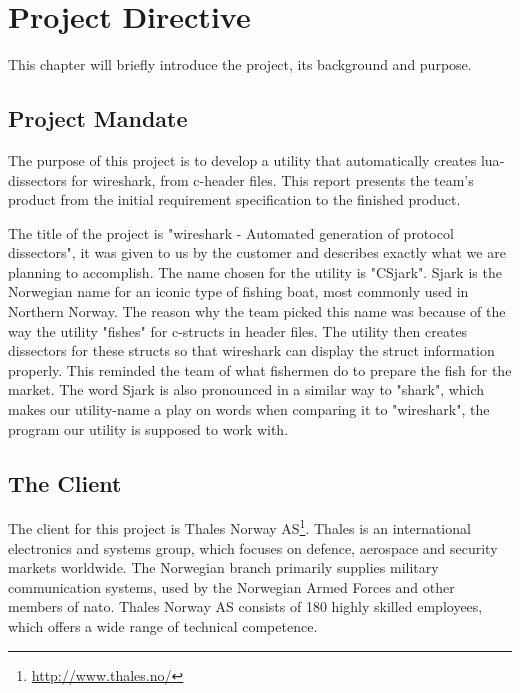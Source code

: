 \chapter{Project Directive}
This chapter will briefly introduce the project, its background and purpose.


\section{Project Mandate}
The purpose of this project is to develop a \gls{utility} that automatically creates \Gls{lua}-\glspl{dissector} for \Gls{wireshark}, from \Gls{c}-\gls{header} files. This report presents the team’s product from the initial requirement specification to the finished product. 

The title of the project is "\Gls{wireshark} - Automated generation of \gls{protocol} \glspl{dissector}", it was given to us by the customer and describes exactly what we are planning to accomplish.\cite{Compendium} The name chosen for the \gls{utility} is "CSjark". Sjark is the Norwegian name for an iconic type of fishing boat, most commonly used in Northern Norway. The reason why the team picked this name was because of the way the \gls{utility} "fishes" for \Gls{c}-\glspl{struct} in \gls{header} files. The \gls{utility} then creates \glspl{dissector} for these \glspl{struct} so that \Gls{wireshark} can display the \gls{struct} information properly. This reminded the team of what fishermen do to prepare the fish for the market. The word Sjark is also pronounced in a similar way to "shark", which makes our \gls{utility}-name a play on words when comparing it to "\Gls{wireshark}", the program our \gls{utility} is supposed to work with.


\section{The Client}
The client for this project is
Thales Norway AS\footnote{\url{http://www.thales.no/}}. Thales is an
international electronics and systems group, which focuses on defence,
aerospace and security markets worldwide. The Norwegian branch primarily
supplies military communication systems, used by the Norwegian Armed Forces
and other members of \Gls{nato}. Thales Norway AS consists of 180 highly skilled
employees, which offers a wide range of technical competence.\cite{ThalesNO}
	
